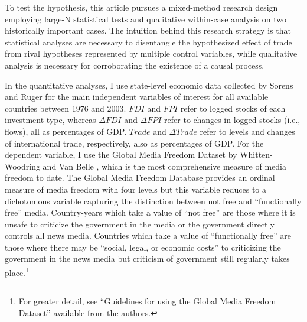 \documentclass[12pt,a4paper]{article}
\begin{document}
To test the hypothesis, this article pursues a mixed-method research design employing large-N statistical tests and qualitative within-case analysis on two historically important cases. The intuition behind this research strategy is that statistical analyses are necessary to disentangle the hypothesized effect of trade from rival hypotheses represented by multiple control variables, while qualitative analysis is necessary for corroborating the existence of a causal process.

In the quantitative analyses, I use state-level economic data collected by Sorens and Ruger \parencite*{Sorens:wc} for the main independent variables of interest for all available countries between 1976 and 2003. $FDI$ and $FPI$ refer to logged stocks of each investment type, whereas $\Delta FDI$ and $\Delta FPI$ refer to changes in logged stocks (i.e., flows), all as percentages of GDP. $Trade$ and $\Delta Trade$ refer to levels and changes of international trade, respectively, also as percentages of GDP.   For the dependent variable, I use the Global Media Freedom Dataset by Whitten-Woodring and Van Belle \parencites*{van2000press}{Belle:1997wo}, which is the most comprehensive measure of media freedom to date. The Global Media Freedom Database provides an ordinal measure of media freedom with four levels but this variable reduces to a dichotomous variable capturing the distinction between not free and ``functionally free'' media. Country-years which take a value of ``not free'' are those where it is unsafe to criticize the government in the media or the government directly controls all news media. Countries which take a value of ``functionally free'' are those where there may be ``social, legal, or economic costs'' to criticizing the government in the news media but criticism of government still regularly takes place.\footnote{For greater detail, see ``Guidelines for using the Global Media Freedom Dataset'' available from the authors.}
\end{document}
